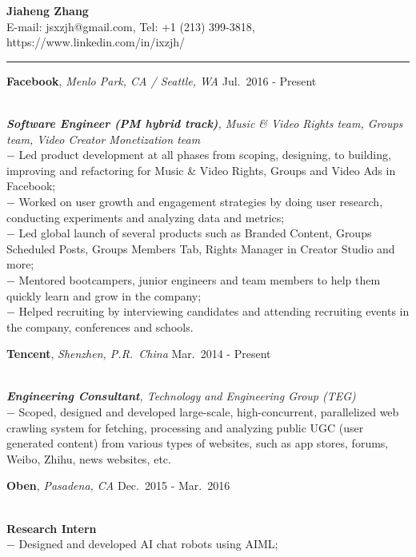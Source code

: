 \documentclass[a4paper,10pt]{article}
\newcommand{\shadedsection}[1]{
    \setlength{\fboxsep}{0pt}
    \colorbox{shadecolor}{%
        \begin{minipage}{\linewidth}%
            \vspace{0.2em}%
            #1%
        \end{minipage}%
    }
}
\newenvironment{rSection}[1]{ %
  \medskip
  \hspace{-1.5em}{\color{Blue}\MakeUppercase{\large \bf {#1}}} %
  \vspace{-0.2em}
  \medskip
  \hrule %
  \begin{list}{}{ %
    \setlength{\leftmargin}{1.5em} %
  }
\setlength{\itemsep}{1pt}
  \item[]
}{
  \end{list}
}
\newcommand{\detail}[1]{{$-$ {#1}}}
\newcommand{\period}[3]{\normalsize {#1} \hfill {#2} - {#3}}
\begin{document}
\begin{center}
  {\huge \bf \color{Blue} Jiaheng Zhang}\\
  \medskip
  {E-mail: jsxzjh@gmail.com, Tel: +1 (213) 399-3818, https://www.linkedin.com/in/ixzjh/}
\end{center}

\begin{rSection}{Experience}
  \vspace{-1.5em}
  \item
    \shadedsection{\period{{\bf Facebook}, {\em Menlo Park, CA / Seattle, WA}}{Jul.~2016}{Present}}\\
    {\em {\bf Software Engineer (PM hybrid track)}, Music \& Video Rights team, Groups team, Video Creator Monetization team}\\
    \detail{Led product development at all phases from scoping, designing, to building, improving and refactoring for Music \& Video Rights, Groups and Video Ads in Facebook;}\\
    \detail{Worked on user growth and engagement strategies by doing user research, conducting experiments and analyzing data and metrics;}\\
    \detail{Led global launch of several products such as Branded Content, Groups Scheduled Posts, Groups Members Tab, Rights Manager in Creator Studio and more;}\\
    \detail{Mentored bootcampers, junior engineers and team members to help them quickly learn and grow in the company;}\\
    \detail{Helped recruiting by interviewing candidates and attending recruiting events in the company, conferences and schools.}
  \item
    \shadedsection{\period{{\bf Tencent}, {\em Shenzhen, P.R.~China}}{Mar.~2014}{Present}}\\
    {\em {\bf Engineering Consultant}, Technology and Engineering Group (TEG)}\\
    \detail{Scoped, designed and developed large-scale, high-concurrent, parallelized web crawling system for fetching, processing and analyzing public UGC (user generated content) from various types of websites, such as app stores, forums, Weibo, Zhihu, news websites, etc.}
  \item
    \shadedsection{\period{{\bf Oben}, {\em Pasadena, CA}}{Dec.~2015}{Mar.~2016}}\\
    {\bf Research Intern}\\
    \detail{Designed and developed AI chat robots using AIML;}\\

\end{rSection}
\end{document}
